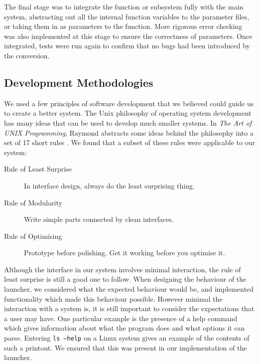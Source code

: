 \documentclass[a4paper,11pt]{article}
\begin{document}
   The final stage was to integrate the function or subsystem fully with the
   main system, abstracting out all the internal function variables to the
   parameter files, or taking them in as parameters to the function. More
   rigorous error checking was also implemented at this stage to ensure the
   correctness of parameters. Once integrated, tests were run again to confirm
   that no bugs had been introduced by the conversion.
\subsection{Development Methodologies}
\label{sec-4-2}

   We used a few principles of software development that we believed could guide
   us to create a better system. The Unix philosophy of operating system
   development has many ideas that can be used to develop much smaller
   systems. In \emph{The Art of UNIX Programming}, Raymond abstracts some ideas
   behind the philosophy into a set of 17 short rules \cite{artunix}. We found
   that a subset of these rules were applicable to our system:

   \begin{description}
   \item[Rule of Least Surprise] In interface design, always do the least
   surprising thing.
   \item[Rule of Modularity] Write simple parts connected by clean interfaces.
   \item[Rule of Optimising] Prototype before polishing. Get it working before
   you optimise it.
   \end{description}
   
   Although the interface in our system involves minimal interaction, the rule
   of least surprise is still a good one to follow. When designing the behaviour
   of the launcher, we considered what the expected behaviour would be, and
   implemented functionality which made this behaviour possible. However minimal
   the interaction with a system is, it is still important to consider the
   expectations that a user may have. One particular example is the presence of
   a help command which gives information about what the program does and what
   options it can parse. Entering \texttt{ls --help} on a Linux system gives an
   example of the contents of such a printout. We ensured that this was present
   in our implementation of the launcher.
\end{document}
